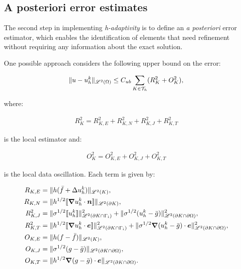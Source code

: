 \newpage
\subsection{A posteriori error estimates}

The second step in implementing \textit{h-adaptivity} is to define an \textit{a posteriori} error estimator, which enables the identification of elements that need refinement without requiring any information about the exact solution.

\cite{Cangiani2023} One possible approach considers the following upper bound on the error:

\begin{gather}
	\lVert u - u^k_h \rVert_{\mathscr{L}^2(\Omega)} \leq C_{ub} \sum_{K \in \mathcal{T}_h} (R_K^2 + O_K^2),
\end{gather}

where:

\begin{gather}
	R_K^2 = R_{K, E}^2 + R_{K, N}^2 + R_{K, J}^2 + R_{K, T}^2
\end{gather}

is the local estimator and:

\begin{gather}
	O_K^2 = O_{K, E}^2 + O_{K, J}^2 + O_{K, T}^2
\end{gather}

is the local data oscillation. Each term is given by:

\begin{align}
	R_{K, E} &= \lVert h (\bar{f} + \Delta u^k_h) \rVert_{\mathscr{L}^2(K)}, \\
	R_{K, N} &= \lVert h^{1/2} \llbracket \bm{\nabla} u^k_h \cdot \bm{n} \rrbracket \rVert_{\mathscr{L}^2(\partial K)}, \\
	R^2_{K, J} &= \lVert \sigma^{1/2} \llbracket u^k_h \rrbracket \rVert^2_{\mathscr{L}^2(\partial K \cap \Gamma_{i})} + \lVert \sigma^{1/2} (u^k_h - \bar{g}) \rVert^2_{\mathscr{L}^2(\partial K \cap \partial \Omega)}, \\
	R^2_{K, T} &= \lVert h^{1/2} \llbracket \bm{\nabla} u^k_h \cdot \bm{e} \rrbracket \rVert^2_{\mathscr{L}^2(\partial K \cap \Gamma_{i})} + \lVert \sigma^{1/2} \bm{\nabla} (u^k_h - \bar{g}) \cdot \bm{e} \rVert^2_{\mathscr{L}^2(\partial K \cap \partial \Omega)}, \\
	O_{K, E} &= \lVert h (f - \bar{f}) \rVert_{\mathscr{L}^2(K)}, \\
	O_{K, J} &= \lVert \sigma^{1/2} (g - \bar{g}) \rVert_{\mathscr{L}^2(\partial K \cap \partial \Omega)}, \\
	O_{K, T} &= \lVert h^{1/2} \bm{\nabla} (g - \bar{g}) \cdot \bm{e} \rVert_{\mathscr{L}^2(\partial K \cap \partial \Omega)}.
\end{align}

